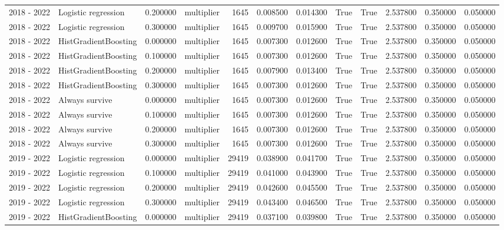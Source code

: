 \begin{tabular}{llrlrrrrrrrr}
2018 - 2022 & Logistic regression & 0.200000 & multiplier & 1645 & 0.008500 & 0.014300 & True & True & 2.537800 & 0.350000 & 0.050000 \\
2018 - 2022 & Logistic regression & 0.300000 & multiplier & 1645 & 0.009700 & 0.015900 & True & True & 2.537800 & 0.350000 & 0.050000 \\
2018 - 2022 & HistGradientBoosting & 0.000000 & multiplier & 1645 & 0.007300 & 0.012600 & True & True & 2.537800 & 0.350000 & 0.050000 \\
2018 - 2022 & HistGradientBoosting & 0.100000 & multiplier & 1645 & 0.007300 & 0.012600 & True & True & 2.537800 & 0.350000 & 0.050000 \\
2018 - 2022 & HistGradientBoosting & 0.200000 & multiplier & 1645 & 0.007900 & 0.013400 & True & True & 2.537800 & 0.350000 & 0.050000 \\
2018 - 2022 & HistGradientBoosting & 0.300000 & multiplier & 1645 & 0.007300 & 0.012600 & True & True & 2.537800 & 0.350000 & 0.050000 \\
2018 - 2022 & Always survive & 0.000000 & multiplier & 1645 & 0.007300 & 0.012600 & True & True & 2.537800 & 0.350000 & 0.050000 \\
2018 - 2022 & Always survive & 0.100000 & multiplier & 1645 & 0.007300 & 0.012600 & True & True & 2.537800 & 0.350000 & 0.050000 \\
2018 - 2022 & Always survive & 0.200000 & multiplier & 1645 & 0.007300 & 0.012600 & True & True & 2.537800 & 0.350000 & 0.050000 \\
2018 - 2022 & Always survive & 0.300000 & multiplier & 1645 & 0.007300 & 0.012600 & True & True & 2.537800 & 0.350000 & 0.050000 \\
2019 - 2022 & Logistic regression & 0.000000 & multiplier & 29419 & 0.038900 & 0.041700 & True & True & 2.537800 & 0.350000 & 0.050000 \\
2019 - 2022 & Logistic regression & 0.100000 & multiplier & 29419 & 0.041000 & 0.043900 & True & True & 2.537800 & 0.350000 & 0.050000 \\
2019 - 2022 & Logistic regression & 0.200000 & multiplier & 29419 & 0.042600 & 0.045500 & True & True & 2.537800 & 0.350000 & 0.050000 \\
2019 - 2022 & Logistic regression & 0.300000 & multiplier & 29419 & 0.043400 & 0.046500 & True & True & 2.537800 & 0.350000 & 0.050000 \\
2019 - 2022 & HistGradientBoosting & 0.000000 & multiplier & 29419 & 0.037100 & 0.039800 & True & True & 2.537800 & 0.350000 & 0.050000 \\

\end{tabular}
